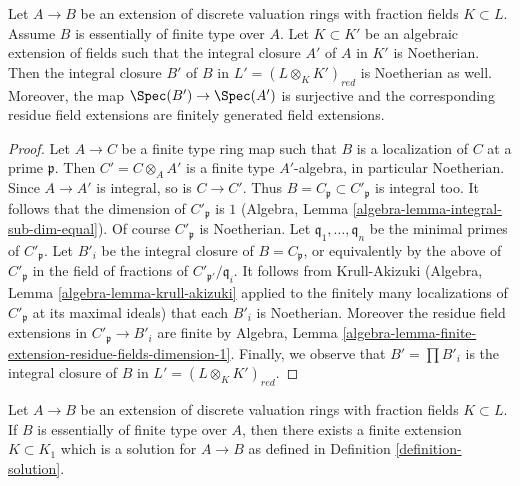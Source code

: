 \begin{lemma}
\label{lemma-big-extension-is-ok}
Let $A \to B$ be an extension of discrete valuation rings with fraction
fields $K \subset L$. Assume $B$ is essentially of finite type over $A$.
Let $K \subset K'$ be an algebraic extension of fields such that
the integral closure $A'$ of $A$ in $K'$ is Noetherian. Then the integral
closure $B'$ of $B$ in $L' = (L \otimes_K K')_{red}$ is Noetherian
as well. Moreover, the map $\Spec(B') \to \Spec(A')$
is surjective and the corresponding residue field extensions are finitely
generated field extensions.
\end{lemma}

\begin{proof}
Let $A \to C$ be a finite type ring map such that $B$ is a localization of
$C$ at a prime $\mathfrak p$. Then $C' = C \otimes_A A'$ is a finite type
$A'$-algebra, in particular Noetherian. Since $A \to A'$ is integral, so
is $C \to C'$. Thus $B = C_\mathfrak p \subset C'_\mathfrak p$ is
integral too. It follows that the dimension of $C'_\mathfrak p$ is $1$
(Algebra, Lemma \ref{algebra-lemma-integral-sub-dim-equal}).
Of course $C'_\mathfrak p$ is Noetherian.
Let $\mathfrak q_1, \ldots, \mathfrak q_n$ be the minimal primes
of $C'_\mathfrak p$. Let $B'_i$ be the integral closure of
$B = C_\mathfrak p$, or equivalently by the above of $C'_\mathfrak p$
in the field of fractions of $C'_{\mathfrak p'}/\mathfrak q_i$.
It follows from Krull-Akizuki
(Algebra, Lemma \ref{algebra-lemma-krull-akizuki} applied
to the finitely many localizations of $C'_\mathfrak p$ at its
maximal ideals) that each $B'_i$ is Noetherian.
Moreover the residue field extensions in $C'_\mathfrak p \to B'_i$
are finite by
Algebra, Lemma \ref{algebra-lemma-finite-extension-residue-fields-dimension-1}.
Finally, we observe that $B' = \prod B'_i$ is the integral closure of $B$ in
$L' = (L \otimes_K K')_{red}$.
\end{proof}

\begin{proposition}
\label{proposition-epp-essentially-finite-type}
Let $A \to B$ be an extension of discrete valuation rings with fraction
fields $K \subset L$. If $B$ is essentially of finite type over $A$, then
there exists a finite extension $K \subset K_1$ which is a solution for
$A \to B$ as defined in
Definition \ref{definition-solution}.
\end{proposition}


